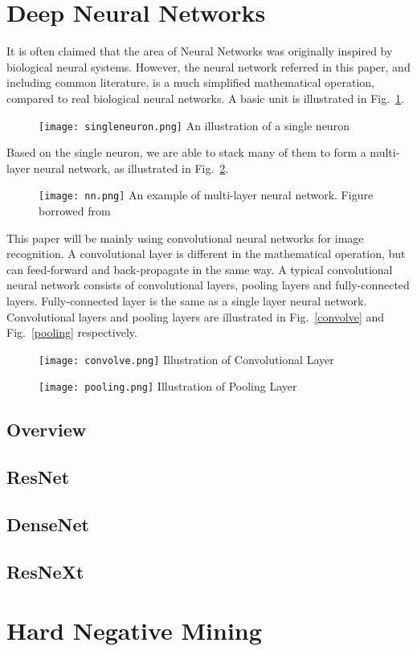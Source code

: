 \section{Deep Neural Networks}
It is often claimed that the area of Neural Networks was originally inspired by biological neural systems. However, the neural network referred in this paper, and including common literature, is a much simplified mathematical operation, compared to real biological neural networks. A basic unit is illustrated in Fig.~\ref{fig:singleneuron}.
\begin{figure}[!htp]
	\centering
	\texttt{[image: singleneuron.png]}
	{An illustration of a single neuron}
	\label{fig:singleneuron}
\end{figure}
Based on the single neuron, we are able to stack many of them to form a multi-layer neural network, as illustrated in Fig.~\ref{fig:nn}.
\begin{figure}[!htp]
	\centering
	\texttt{[image: nn.png]}
	{An example of multi-layer neural network. Figure borrowed from \cite{lecun2015deep}}
	\label{fig:nn}
\end{figure}
This paper will be mainly using convolutional neural networks for image recognition. A convolutional layer is different in the mathematical operation, but can feed-forward and back-propagate in the same way. A typical convolutional neural network consists of convolutional layers, pooling layers and fully-connected layers. Fully-connected layer is the same as a single layer neural network. Convolutional layers and pooling layers are illustrated in Fig.~\ref{convolve} and Fig.~\ref{pooling} respectively. 
\begin{figure}[!htp]
	\centering
	\texttt{[image: convolve.png]}
	{Illustration of Convolutional Layer}
	\label{fig:convolve}
\end{figure}
\begin{figure}[!htp]
	\centering
	\texttt{[image: pooling.png]}
	{Illustration of Pooling Layer}
	\label{fig:pooling}
\end{figure}

\subsection{Overview}

\subsection{ResNet}
\subsection{DenseNet}
\subsection{ResNeXt}
\section{Hard Negative Mining}



